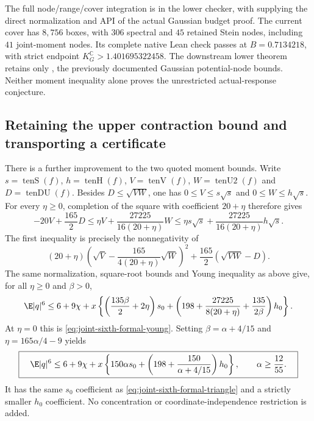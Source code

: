 The full node/range/cover integration is in the lower checker, with
 supplying the direct
normalization and  API of the actual Gaussian
budget proof. The current cover has $8{,}756$ boxes, with $306$ spectral
and $45$ retained Stein nodes, including $41$ joint-moment nodes. Its
complete native Lean check passes at $B=0.7134218$, with strict endpoint
$K_G^{\mathbb C}>1.401695322458$. The downstream lower theorem retains
only , the previously documented Gaussian potential-node
bounds. Neither moment inequality alone proves the unrestricted
actual-response conjecture.

\subsection{Retaining the upper contraction bound and transporting a certificate}
\label{sec:joint-sixth-transport}
There is a further improvement to the two quoted moment bounds. Write
$s=\operatorname{tenS}(f)$, $h=\operatorname{tenH}(f)$,
$V=\operatorname{tenV}(f)$, $W=\operatorname{tenU2}(f)$ and
$D=\operatorname{tenDU}(f)$. Besides $D\le\sqrt{VW}$, one has
$0\le V\le s\sqrt s$ and $0\le W\le h\sqrt s$.
For every $\eta\ge0$, completion of the square with coefficient $20+\eta$
therefore gives
\[
 -20V+\frac{165}2D
 \le\eta V+\frac{27225}{16(20+\eta)}W
 \le\eta s\sqrt s+\frac{27225}{16(20+\eta)}h\sqrt s.
\]
The first inequality is precisely the nonnegativity of
\[
 (20+\eta)\left(\sqrt V-
 \frac{165}{4(20+\eta)}\sqrt W\right)^2
 +\frac{165}2(\sqrt{VW}-D).
\]
The same normalization, square-root bounds and Young inequality as above give,
for all $\eta\ge0$ and $\beta>0$,
\begin{equation}\label{eq:joint-sixth-eta}
 \E|q|^6\le6+9\chi+x\left\{
 \left(\frac{135\beta}2+2\eta\right)s_0+
 \left(198+\frac{27225}{8(20+\eta)}+
       \frac{135}{2\beta}\right)h_0\right\}.
\end{equation}
At $\eta=0$ this is \eqref{eq:joint-sixth-formal-young}.
Setting $\beta=\alpha+4/15$ and $\eta=165\alpha/4-9$ yields
\begin{equation}\label{eq:joint-sixth-shifted}
 \boxed{\quad
 \E|q|^6\le6+9\chi+x\left\{
 150\alpha s_0+\left(198+\frac{150}{\alpha+4/15}\right)h_0
 \right\},\qquad\alpha\ge\frac{12}{55}.
 \quad}
\end{equation}
It has the same $s_0$ coefficient as
\eqref{eq:joint-sixth-formal-triangle} and a strictly smaller $h_0$
coefficient. No concentration or coordinate-independence restriction is added.


